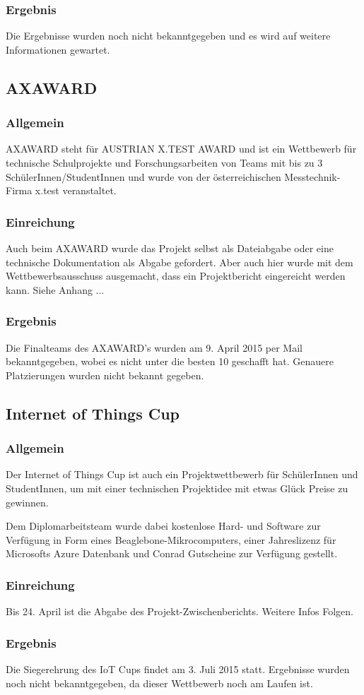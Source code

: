 \subsubsection{Ergebnis}
Die Ergebnisse wurden noch nicht bekanntgegeben und es wird auf weitere Informationen gewartet.


\subsection{AXAWARD}
\subsubsection{Allgemein}
AXAWARD steht für AUSTRIAN X.TEST AWARD und ist ein Wettbewerb für technische Schulprojekte und Forschungsarbeiten
von Teams mit bis zu 3 SchülerInnen/StudentInnen und wurde von der österreichischen Messtechnik-Firma x.test veranstaltet.

\subsubsection{Einreichung}
Auch beim AXAWARD wurde das Projekt selbst als Dateiabgabe oder eine technische
Dokumentation als Abgabe gefordert. Aber auch hier wurde mit dem Wettbewerbsausschuss ausgemacht,
dass ein Projektbericht eingereicht werden kann. Siehe Anhang ...
\subsubsection{Ergebnis}
Die Finalteams des AXAWARD's wurden am 9. April 2015 per Mail bekanntgegeben, wobei es \sblit nicht
unter die besten 10 geschafft hat. Genauere Platzierungen wurden nicht bekannt gegeben.


\subsection{Internet of Things Cup}
\subsubsection{Allgemein}
Der Internet of Things Cup ist auch ein Projektwettbewerb für SchülerInnen und StudentInnen,
um mit einer technischen Projektidee mit etwas Glück Preise zu gewinnen.

Dem Diplomarbeitsteam wurde dabei kostenlose Hard- und Software zur Verfügung in Form eines
Beaglebone-Mikrocomputers, einer Jahreslizenz für Microsofts Azure Datenbank und Conrad Gutscheine
zur Verfügung gestellt.

\subsubsection{Einreichung}
Bis 24. April ist die Abgabe des Projekt-Zwischenberichts. Weitere Infos Folgen.

\subsubsection{Ergebnis}
Die Siegerehrung des IoT Cups findet am 3. Juli 2015 statt. Ergebnisse wurden noch nicht bekanntgegeben,
da dieser Wettbewerb noch am Laufen ist.
